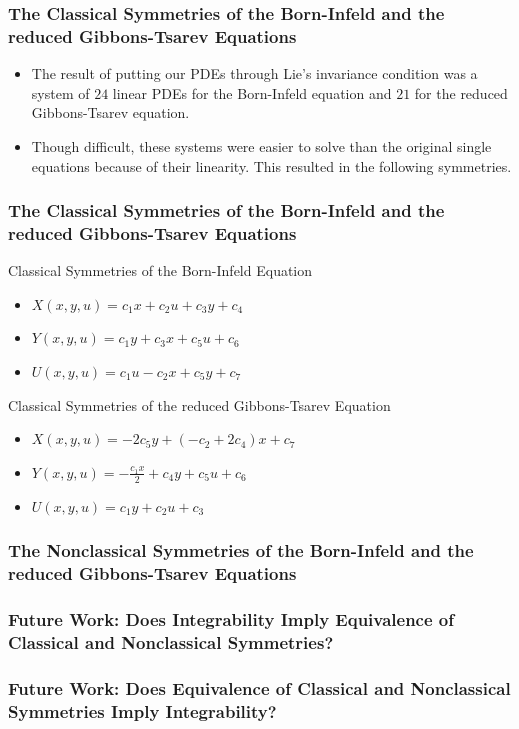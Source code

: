 \documentclass{beamer}
\begin{document}
\begin{frame}
    \frametitle{The Classical Symmetries of the Born-Infeld and the reduced Gibbons-Tsarev Equations}
        \begin{itemize}
            \item The result of putting our PDEs through Lie's invariance condition was a system of $24$ linear PDEs for the Born-Infeld equation and $21$ for the reduced Gibbons-Tsarev equation. \pause
            \item Though difficult, these systems were easier to solve than the original single equations because of their linearity. This resulted in the following symmetries.
        \end{itemize}
\end{frame}


\begin{frame}
    \frametitle{The Classical Symmetries of the Born-Infeld and the reduced Gibbons-Tsarev Equations}
        \begin{large}Classical Symmetries of the Born-Infeld Equation\end{large}
        \begin{itemize}
            \item $X(x,y,u) = c_1x + c_2u + c_3y + c_4$
            \item $Y(x,y,u) = c_1y + c_3x + c_5u + c_6$
            \item $U(x,y,u) = c_1u - c_2x + c_5y + c_7$
        \end{itemize}
        \vspace*{0.25in}
        \begin{large}Classical Symmetries of the reduced Gibbons-Tsarev Equation\end{large}
        \begin{itemize}
            \item $X(x,y,u) = -2c_5y + (-c_2 + 2c_4)x + c_7$
            \item $Y(x,y,u) = -\frac{c_1x}{2} + c_4y + c_5u + c_6$
            \item $U(x,y,u) = c_1y + c_2u + c_3$	
        \end{itemize}
\end{frame}


\begin{frame}
    \frametitle{The Nonclassical Symmetries of the Born-Infeld and the reduced Gibbons-Tsarev Equations}

\end{frame}



\begin{frame}
    \frametitle{Future Work: Does Integrability Imply Equivalence of Classical and Nonclassical Symmetries?}

\end{frame}



\begin{frame}
    \frametitle{Future Work: Does Equivalence of Classical and Nonclassical Symmetries Imply Integrability?}

\end{frame}
\end{document}
